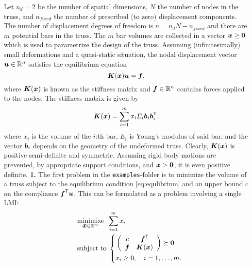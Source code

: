 \documentclass{article}
\newcommand{\bm}[1]{\mbox{\boldmath $#1$}}
\newcommand{\T}{\textsf{T}}
\begin{document}
Let $n_{d} = 2$ be the number of spatial dimensions, $N$ the number of nodes in the truss, and $n_{fixed}$ the number of prescribed (to zero) displacement components. The number of displacement degrees of freedom is $n=n_{d}N-n_{fixed}$ and there are $m$ potential bars in the truss.
The $m$ bar volumes are collected in a vector $\bm{x}\geq\bm{0}$ which is used to parametrize the design of the truss. Assuming (infinitesimally) small deformations and a quasi-static situation, the nodal displacement vector $\bm{u}\in\mathbb{R}^{n}$ satisfies the equilibrium equation
\begin{equation}\label{eq:equlibrium}
\bm{K}(\bm{x})\bm{u} = \bm{f},
\end{equation}
where $\bm{K}(\bm{x})$ is known as the stiffness matrix and $\bm{f}\in\mathbb{R}^{n}$ contains forces applied to the nodes. The  stiffness matrix is given by
\begin{equation}\nonumber
\bm{K}(\bm{x}) = \sum_{i=1}^{m}x_{i}E_{i}\bm{b}_{i}\bm{b}_{i}^{\T},
\end{equation}
where $x_{i}$ is the volume of the $i$:th bar, $E_{i}$ is Young's modulus of said bar, and the vector $\bm{b}_{i}$ depends on the geometry of the undeformed truss. Clearly, $\bm{K}(\bm{x})$ is positive semi-definite and symmetric. Assuming rigid body motions are prevented, by appropriate support conditions, and $\bm{x}>\bm{0}$, it is even positive definite.
\vskip2mm
\noindent\textbf{1.} The first problem in the \texttt{examples}-folder is to minimize the volume of a truss subject to the equilibrium condition \eqref{eq:equlibrium} and an upper bound $c$ on the compliance $\bm{f}^{\T}\bm{u}$. This can be formulated as a problem involving a single LMI: 
\begin{equation}\label{eq:prob1}
\quad
	\begin{aligned}
	&	\underset{\bm{x}\in\mathbb{R}^{m}}{\mbox{minimize}} \;\; \sum_{i=1}^{m}x_{i} \\
	&	\mbox{subject to} \;
	\left\{
		\begin{aligned}
		  & \left(
\begin{array}{cc}
c &\bm{f}^{\T}         \\
\bm{f} & \bm{K}(\bm{x})
\end{array}
\right) \succeq \bm{0} \\
			& x_{i} \geq 0 , \quad i=1,\ldots,m.
		\end{aligned}
		\right.
	\end{aligned}
\end{equation}
\end{document}
